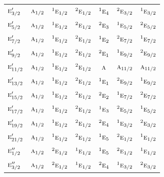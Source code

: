 \documentclass[10pt,a4paper]{article}
\numberwithin{equation}{section}
\newcommand{\irr}[1]{\text{\normalfont\scshape #1}}
\newcommand{\conjpair}[1]{{}^{#1}}
\begin{document}
{\begin{longtable}{@{}lcccccc@{}}
$\irr{e}_{3/2}'$ & $\irr{a}_{1/2}$ & $\conjpair{1}\irr{e}_{1/2}$ & $\conjpair{2}\irr{e}_{1/2}$ & $\conjpair{1}\irr{e}_{4}$ & $\conjpair{2}\irr{e}_{3/2}$ & $\conjpair{1}\irr{e}_{3/2}$\\
$\irr{e}_{5/2}'$ & $\irr{a}_{1/2}$ & $\conjpair{1}\irr{e}_{1/2}$ & $\conjpair{2}\irr{e}_{1/2}$ & $\conjpair{2}\irr{e}_{3}$ & $\conjpair{1}\irr{e}_{5/2}$ & $\conjpair{2}\irr{e}_{5/2}$\\
$\irr{e}_{7/2}'$ & $\irr{a}_{1/2}$ & $\conjpair{1}\irr{e}_{1/2}$ & $\conjpair{2}\irr{e}_{1/2}$ & $\conjpair{1}\irr{e}_{2}$ & $\conjpair{2}\irr{e}_{7/2}$ & $\conjpair{1}\irr{e}_{7/2}$\\
$\irr{e}_{9/2}'$ & $\irr{a}_{1/2}$ & $\conjpair{1}\irr{e}_{1/2}$ & $\conjpair{2}\irr{e}_{1/2}$ & $\conjpair{2}\irr{e}_{1}$ & $\conjpair{1}\irr{e}_{9/2}$ & $\conjpair{2}\irr{e}_{9/2}$\\
$\irr{e}_{11/2}'$ & $\irr{a}_{1/2}$ & $\conjpair{1}\irr{e}_{1/2}$ & $\conjpair{2}\irr{e}_{1/2}$ & $\irr{a}$ & $\irr{a}_{11/2}$ & $\irr{a}_{11/2}$\\
$\irr{e}_{13/2}'$ & $\irr{a}_{1/2}$ & $\conjpair{1}\irr{e}_{1/2}$ & $\conjpair{2}\irr{e}_{1/2}$ & $\conjpair{1}\irr{e}_{1}$ & $\conjpair{2}\irr{e}_{9/2}$ & $\conjpair{1}\irr{e}_{9/2}$\\
$\irr{e}_{15/2}'$ & $\irr{a}_{1/2}$ & $\conjpair{1}\irr{e}_{1/2}$ & $\conjpair{2}\irr{e}_{1/2}$ & $\conjpair{2}\irr{e}_{2}$ & $\conjpair{1}\irr{e}_{7/2}$ & $\conjpair{2}\irr{e}_{7/2}$\\
$\irr{e}_{17/2}'$ & $\irr{a}_{1/2}$ & $\conjpair{1}\irr{e}_{1/2}$ & $\conjpair{2}\irr{e}_{1/2}$ & $\conjpair{1}\irr{e}_{3}$ & $\conjpair{2}\irr{e}_{5/2}$ & $\conjpair{1}\irr{e}_{5/2}$\\
$\irr{e}_{19/2}'$ & $\irr{a}_{1/2}$ & $\conjpair{1}\irr{e}_{1/2}$ & $\conjpair{2}\irr{e}_{1/2}$ & $\conjpair{2}\irr{e}_{4}$ & $\conjpair{1}\irr{e}_{3/2}$ & $\conjpair{2}\irr{e}_{3/2}$\\
$\irr{e}_{21/2}'$ & $\irr{a}_{1/2}$ & $\conjpair{1}\irr{e}_{1/2}$ & $\conjpair{2}\irr{e}_{1/2}$ & $\conjpair{1}\irr{e}_{5}$ & $\conjpair{2}\irr{e}_{1/2}$ & $\conjpair{1}\irr{e}_{1/2}$\\
$\irr{e}_{1/2}''$ & $\irr{a}_{1/2}$ & $\conjpair{2}\irr{e}_{1/2}$ & $\conjpair{1}\irr{e}_{1/2}$ & $\conjpair{1}\irr{e}_{5}$ & $\conjpair{2}\irr{e}_{1/2}$ & $\conjpair{1}\irr{e}_{1/2}$\\
$\irr{e}_{3/2}''$ & $\irr{a}_{1/2}$ & $\conjpair{2}\irr{e}_{1/2}$ & $\conjpair{1}\irr{e}_{1/2}$ & $\conjpair{2}\irr{e}_{4}$ & $\conjpair{1}\irr{e}_{3/2}$ & $\conjpair{2}\irr{e}_{3/2}$\\

\end{longtable}}
\end{document}
